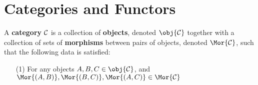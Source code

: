 \section{Categories and Functors}\label{section_1.1}

\begin{definition}
  A \textbf{category} $\mathcal{C}$ is a collection of \textbf{objects},
  denoted $\obj{\Cc}$ together with a collection of sets of
  \textbf{morphisms} between pairs of objects, denoted $\Mor{\Cc}$,
  such that the following data is satisfied:
  \begin{enumerate}
    \item[(1)] For any objects $A,B,C \in \obj{\Cc}$, and
      $\Mor{(A,B)}, \Mor{(B,C)}, \Mor{(A,C)} \in \Mor{\Cc}$
  \end{enumerate}
\end{definition}
